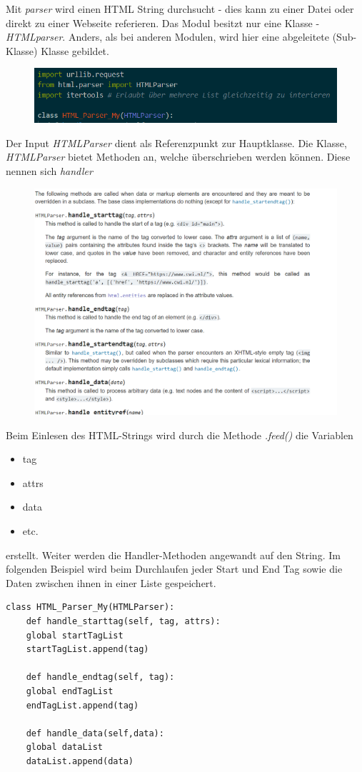 Mit \textit{parser} wird einen \gls{HTML} String durchsucht - dies kann zu einer Datei oder direkt zu einer Webseite referieren.
Das Modul besitzt nur eine Klasse - \textit{HTMLparser}. Anders, als bei anderen Modulen, wird hier eine abgeleitete (Sub-Klasse) Klasse gebildet.
\begin{figure}[H]
	\centering
	\includegraphics[scale = 0.3]{attachment/chapter_3/Scc076}
\end{figure} 
Der Input \textit{HTMLParser} dient als Referenzpunkt zur Hauptklasse. Die Klasse, \textit{HTMLParser} bietet Methoden an, welche überschrieben werden können. Diese nennen sich \textit{handler}
\begin{figure}[H]
	\centering
	\includegraphics[scale = 0.3]{attachment/chapter_3/Scc077}
\end{figure} 
Beim Einlesen des \gls{HTML}-Strings wird durch die Methode \textit{.feed()} die Variablen
\begin{itemize}
	\item tag
	\item attrs
	\item data
	\item etc.
\end{itemize}
erstellt. Weiter werden die Handler-Methoden angewandt auf den String. Im folgenden Beispiel wird beim Durchlaufen jeder Start und End Tag sowie die Daten zwischen ihnen in einer Liste gespeichert.
\begin{lstlisting}[style=python]
	class HTML_Parser_My(HTMLParser):
	def handle_starttag(self, tag, attrs):
	global startTagList
	startTagList.append(tag)
	
	def handle_endtag(self, tag):
	global endTagList
	endTagList.append(tag)
	
	def handle_data(self,data):
	global dataList
	dataList.append(data)
\end{lstlisting}

